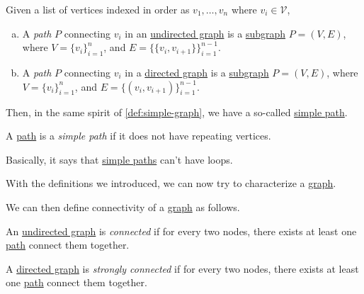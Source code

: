 \begin{definition}[Path]\label{def:path}
	Given a list of vertices indexed in order as \(v_1, \ldots , v_n\) where \(v_i\in \mathcal{V} \),
	\begin{enumerate}[(a)]
		\item A \emph{path} \(P\) connecting \(v_i\) in an \hyperref[def:undirected-graph]{undirected graph} is a \hyperref[def:subgraph]{subgraph} \(P = (V, E)\), where \(V=\{v_i\}_{i=1}^n\), and \(E = \{\{v_i, v_{i+1}\}\}_{i = 1}^{n-1}\).
		\item A \emph{path} \(P\) connecting \(v_i\) in a \hyperref[def:directed-graph]{directed graph} is a \hyperref[def:subgraph]{subgraph} \(P = (V, E)\), where \(V=\{v_i\}_{i=1}^n\), and \(E = \{(v_i, v_{i+1})\}_{i = 1}^{n-1}\).
	\end{enumerate}
\end{definition}

Then, in the same spirit of \autoref{def:simple-graph}, we have a so-called \hyperref[def:simple-path]{simple path}.
\begin{definition}\label{def:simple-path}
	A \hyperref[def:path]{path} is a \emph{simple path} if it does not have repeating vertices.
\end{definition}
\begin{intuition}
	Basically, it says that \hyperref[def:simple-path]{simple paths} can't have loops.
\end{intuition}

With the definitions we introduced, we can now try to characterize a \hyperref[def:graph]{graph}.

\begin{definition*}
	We can then define connectivity of a \hyperref[def:graph]{graph} as follows.
	\begin{definition}[Connected]\label{def:connected}
		An \hyperref[def:undirected-graph]{undirected graph} is \emph{connected} if for every two nodes, there exists at least one \hyperref[def:path]{path} connect them together.
	\end{definition}

	\begin{definition}\label{def:strongly-connected}
		A \hyperref[def:directed-graph]{directed graph} is \emph{strongly connected} if for every two nodes, there exists at least one \hyperref[def:path]{path} connect them together.
	\end{definition}
\end{definition*}

